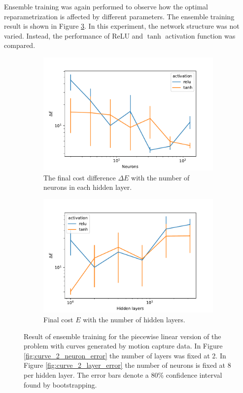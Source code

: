 Ensemble training was again performed to observe how the optimal reparametrization is affected by different parameters. The ensemble training result is shown in Figure \ref{fig:curve_so3_pl_eks}. In this experiment, the network structure was not varied. Instead, the performance of ReLU and \(\tanh\) activation function was compared.

\begin{figure}[t]
    \begin{subfigure}[t]{0.5\textwidth}
        \centering
        \includegraphics[width=\linewidth]{figures/curve_so3/pl_eks_7/neurons_error.pdf}
        \caption{The final cost difference \(\Delta E\) with the number of neurons in each hidden layer.}\label{fig:curve_so3_pl_neuron_error}
    \end{subfigure}
    \begin{subfigure}[t]{0.5\textwidth}
        \centering
        \includegraphics[width=\linewidth]{figures/curve_so3/pl_eks_7/layer_error.pdf}
        \caption{Final cost \(E\) with the number of hidden layers.}\label{fig:curve_so3_pl_layer_error}
    \end{subfigure}
    \caption{Result of ensemble training for the piecewise linear version of the problem with curves generated by motion capture data. In Figure \ref{fig:curve_2_neuron_error} the number of layers was fixed at 2. In Figure \ref{fig:curve_2_layer_error} the number of neurons is fixed at 8 per hidden layer. The error bars denote a 80\% confidence interval found by bootstrapping.}\label{fig:curve_so3_pl_eks}
\end{figure}

